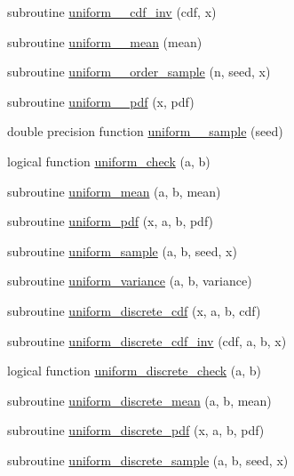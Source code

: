 \begin{DoxyCompactItemize}
\item 
subroutine \hyperlink{subroutines_8f_a72aba79732c10141024277c78076d1c4}{uniform\+\_\+\_\+cdf\+\_\+inv} (cdf, x)
\item 
subroutine \hyperlink{subroutines_8f_a703c0741a0197996b0e9c9341bc0fb20}{uniform\+\_\+\_\+mean} (mean)
\item 
subroutine \hyperlink{subroutines_8f_ac1f3e1cf38a7750036257dd222d4d133}{uniform\+\_\+\_\+order\+\_\+sample} (n, seed, x)
\item 
subroutine \hyperlink{subroutines_8f_a20a976304b1a9dc6e1fbc03e504bc1ef}{uniform\+\_\+\_\+pdf} (x, pdf)
\item 
double precision function \hyperlink{subroutines_8f_a486635f122e7078b243c9f56a9a1e247}{uniform\+\_\+\_\+sample} (seed)
\item 
logical function \hyperlink{subroutines_8f_aa375f84c7dcbc6bd08516cb6c18fcf8a}{uniform\+\_\+check} (a, b)
\item 
subroutine \hyperlink{subroutines_8f_a3073152f6052f105e100e23e980a9dce}{uniform\+\_\+mean} (a, b, mean)
\item 
subroutine \hyperlink{subroutines_8f_a05ec2d1bc3328a8aad5e598852bcbf14}{uniform\+\_\+pdf} (x, a, b, pdf)
\item 
subroutine \hyperlink{subroutines_8f_af92ef0ba8e3c9c529f7b1c4eb0bed4c0}{uniform\+\_\+sample} (a, b, seed, x)
\item 
subroutine \hyperlink{subroutines_8f_a9f30db560b85d07014de26e90a80c834}{uniform\+\_\+variance} (a, b, variance)
\item 
subroutine \hyperlink{subroutines_8f_a70846f32a4c049b18e01802a92db7d96}{uniform\+\_\+discrete\+\_\+cdf} (x, a, b, cdf)
\item 
subroutine \hyperlink{subroutines_8f_aafa76f1cf208f904b15993e0ef66eb85}{uniform\+\_\+discrete\+\_\+cdf\+\_\+inv} (cdf, a, b, x)
\item 
logical function \hyperlink{subroutines_8f_a422da08e6639b40b1e57fac092fde67d}{uniform\+\_\+discrete\+\_\+check} (a, b)
\item 
subroutine \hyperlink{subroutines_8f_a03a4be1295ed7192ae91041a1e64a807}{uniform\+\_\+discrete\+\_\+mean} (a, b, mean)
\item 
subroutine \hyperlink{subroutines_8f_af3de0b9e0c5a479e445bb097f5e6289a}{uniform\+\_\+discrete\+\_\+pdf} (x, a, b, pdf)
\item 
subroutine \hyperlink{subroutines_8f_a224e9cbefb5f1ef40f22420215fd18af}{uniform\+\_\+discrete\+\_\+sample} (a, b, seed, x)
\item 

\end{DoxyCompactItemize}
